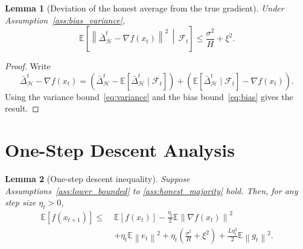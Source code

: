 \documentclass[11pt,a4paper]{article}
\newtheorem{lemma}{Lemma}
\theoremstyle{remark}
\newcommand{\E}{\mathbb{E}}
\newcommand{\F}{\mathcal{F}}
\newcommand{\HH}{\mathcal{H}}
\newcommand{\norm}[1]{\left\lVert #1 \right\rVert}
\begin{document}
\begin{lemma}[Deviation of the honest average from the true gradient]
\label{lem:honest_gradient}
Under Assumption~\ref{ass:bias_variance},
\begin{equation}
    \E\!\left[
        \norm{\bar{\Delta}_{\HH}^t - \nabla f(x_t)}^2
        \,\middle|\, \F_t
    \right]
    \le
    \frac{\sigma^2}{H} + \xi^2.
    \label{eq:honest_gradient_gap}
\end{equation}
\end{lemma}

\begin{proof}
Write
\[
    \bar{\Delta}_{\HH}^t - \nabla f(x_t)
    =
    \left(
        \bar{\Delta}_{\HH}^t -
        \E[\bar{\Delta}_{\HH}^t \mid \F_t]
    \right)
    +
    \left(
        \E[\bar{\Delta}_{\HH}^t \mid \F_t] - \nabla f(x_t)
    \right).
\]
Using the variance bound~\eqref{eq:variance} and the bias bound~\eqref{eq:bias}
gives the result.
\end{proof}

\section{One-Step Descent Analysis}

\begin{lemma}[One-step descent inequality]
\label{lem:descent}
Suppose Assumptions~\ref{ass:lower_bounded} to \ref{ass:honest_majority}
hold.
Then, for any step size \(\eta_t > 0\),
\begin{align}
    \E[f(x_{t+1})]
    \le\;&
    \E[f(x_t)]
    -
    \frac{\eta_t}{2}\E\norm{\nabla f(x_t)}^2
    \nonumber\\
    &+
    \eta_t \E\norm{e_t}^2
    +
    \eta_t\left(\frac{\sigma^2}{H}+\xi^2\right)
    +
    \frac{L\eta_t^2}{2}\E\norm{g_t}^2.
    \label{eq:descent}
\end{align}
\end{lemma}
\end{document}
